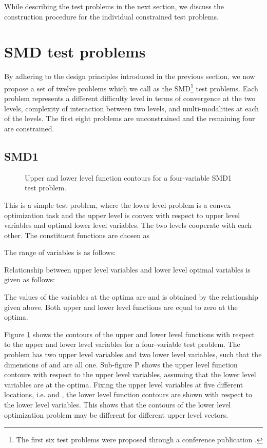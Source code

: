 \documentclass[twoside]{article}
\begin{document}
While describing the test problems in the next section, we discuss the construction procedure for the individual constrained test problems.

\section{SMD test problems}\label{sec:testproblems}

By adhering to the design principles introduced in the previous section, we now propose a set of twelve problems which we call as the SMD\footnote{The first six test problems were proposed through a conference publication \citep{my-cec12a}.} test problems. Each problem represents a different difficulty level in terms of convergence at the two levels, complexity of interaction between two levels, and multi-modalities at each of the levels. The first eight problems are unconstrained and the remaining four are constrained.

\subsection{SMD1}

\begin{figure}
\begin{center}
\caption{Upper and lower level function contours for a four-variable SMD1 test problem.}
\label{fig:smd1-2}
\end{center}
\end{figure}

This is a simple test problem, where the lower level problem is a convex optimization task and the upper level is convex with respect to upper level variables and optimal lower level variables. The two levels cooperate with each other. The constituent functions are chosen as

The range of variables is as follows:

Relationship between upper level variables and lower level optimal variables is given as follows:

The values of the variables at the optima are  and  is obtained by the relationship given above. Both upper and lower level functions are equal to zero at the optima.

Figure \ref{fig:smd1-2} shows the contours of the upper and lower level functions with respect to the upper and lower level variables for a four-variable test problem. The problem has two upper level variables and two lower level variables, such that the dimensions of  and  are all one. Sub-figure P shows the upper level function contours with respect to the upper level variables, assuming that the lower level variables are at the optima. Fixing the upper level variables  at five different locations, i.e.  and , the lower level function contours are shown with respect to the lower level variables. This shows that the contours of the lower level optimization problem may be different for different upper level vectors.
\end{document}
